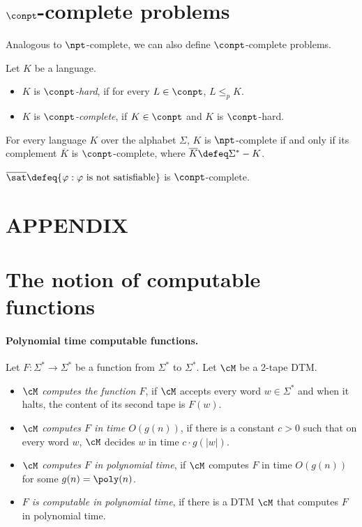 \documentclass[11pt, a4paper]{article}
\begin{document}
\section{$\conpt$-complete problems}
\label{app:sec:conp}

Analogous to $\npt$-complete,
we can also define $\conpt$-complete problems.
\begin{definition}
\label{def:conp-complete}
Let $K$ be a language.
\begin{itemize}
\item 
$K$ is {\em $\conpt$-hard}, if
for every $L \in \conpt$, $L \leq_p K$.
\item
$K$ is {\em $\conpt$-complete},
if $K \in \conpt$ and $K$ is $\conpt$-hard.
\end{itemize}
\end{definition}


\begin{theorem}
\label{theo:conp-complete}
For every language $K$ over the alphabet $\Sigma$,
$K$ is $\npt$-complete if and only if its complement $\overline{K}$ is $\conpt$-complete,
where $\overline{K}\defeq\Sigma^*-K$.
\end{theorem}

\begin{corollary}
\label{cor:unsat-conp-complete}
$\overline{\sat}\defeq \{\varphi : \varphi \ \text{is not satisfiable}\}$ is $\conpt$-complete.
\end{corollary}




\appendix

\section*{APPENDIX}

\section{The notion of computable functions}
\label{app:sec:compute-function}

\paragraph*{Polynomial time computable functions.}
Let $F:\Sigma^*\to \Sigma^*$ be a function from $\Sigma^*$ to $\Sigma^*$.
Let $\cM$ be a 2-tape DTM.
\begin{itemize}
\item 
{\em $\cM$ computes the function $F$}, 
if $\cM$ accepts every word $w\in \Sigma^{\ast}$ and when it halts, 
the content of its second tape is $F(w)$.
\item 
{\em $\cM$ computes $F$ in time $O(g(n))$},
if there is a constant $c>0$ such that
on every word $w$, $\cM$ decides $w$ in time $c\cdot g(|w|)$.
\item 
{\em $\cM$ computes $F$ in polynomial time},
if $\cM$ computes $F$ in time $O(g(n))$ for some $g(n)=\poly(n)$.
\item 
{\em $F$ is computable in polynomial time},
if there is a DTM $\cM$ that computes $F$ in polynomial time.
\end{itemize}
\end{document}
